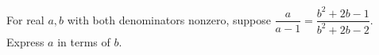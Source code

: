 For real $a,b$ with both denominators nonzero, suppose $\dfrac{a}{a-1}=\dfrac{b^2+2b-1}{b^2+2b-2}$. Express $a$ in terms of $b$.
